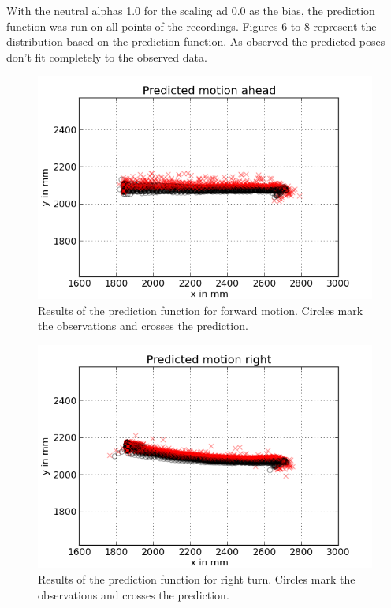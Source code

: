 \documentclass{scrartcl}
\begin{document}
With the neutral alphas 1.0 for the scaling ad 0.0 as the bias, the prediction function was run on all points of the recordings.
Figures 6 to 8 represent the distribution based on the prediction function. As observed the predicted poses don't fit completely to the observed data.

\begin{figure}[H]
\centering
\begin{minipage}{.5\textwidth}
  \centering
  \includegraphics[width=1\linewidth]{img/predictahead.png}
\end{minipage}%

\caption{Results of the prediction function for forward motion. Circles mark the observations and crosses the prediction.}
\label{fig:prediction}
\end{figure}

\begin{figure}[H]
\centering
\begin{minipage}{.5\textwidth}
  \centering
  \includegraphics[width=1\linewidth]{img/predictright.png}
\end{minipage}%

\caption{Results of the prediction function for right turn. Circles mark the observations and crosses the prediction.}
\label{fig:prediction}
\end{figure}
\end{document}
